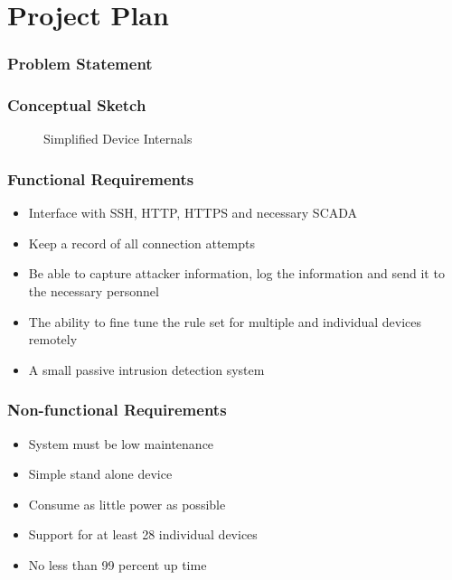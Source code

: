 \section{Project Plan}

\begin{frame}
\frametitle{Problem Statement}


\end{frame}

\begin{frame}
\frametitle{Conceptual Sketch}
\begin{figure}
\centering
{
\scalebox{0.7}{}
}
\caption{Simplified Device Internals}
\end{figure}
\end{frame}

\begin{frame}
\frametitle{Functional Requirements}

\begin{itemize}
\item Interface with SSH, HTTP, HTTPS and necessary SCADA 
\item Keep a record of all connection attempts
\item Be able to capture attacker information, log the information  and send it to the necessary personnel 
\item The ability to fine tune the rule set for multiple and individual devices remotely 
\item A small passive intrusion detection system 
\end{itemize}

\end{frame}

\begin{frame}
\frametitle{Non-functional Requirements}

\begin{itemize}
\item System must be low maintenance
\item Simple stand alone device
\item Consume as little power as possible
\item Support for at least 28 individual devices
\item No less than 99 percent up time
\end{itemize}

\end{frame}

